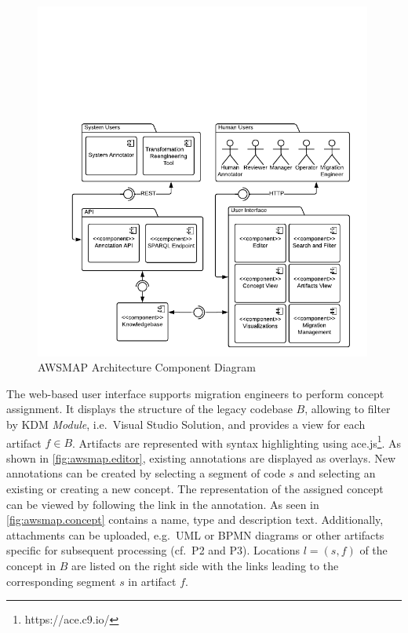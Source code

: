 \begin{figure}
\hypertarget{fig:awsmap}{%
\centering
\includegraphics[width=0.99\textwidth]{../figures/awsmap.pdf}
\caption{AWSMAP Architecture Component Diagram}\label{fig:awsmap}
}
\end{figure}

The web-based user interface supports migration engineers to perform concept assignment.
It displays the structure of the legacy codebase \(B\), allowing to filter by KDM \emph{Module}, i.e.~Visual Studio Solution, and provides a view for each artifact \(f \in B\).
Artifacts are represented with syntax highlighting using ace.js\footnote{https://ace.c9.io/}.
As shown in \cref{fig:awsmap.editor}, existing annotations are displayed as overlays.
New annotations can be created by selecting a segment of code \(s\) and selecting an existing or creating a new concept.
The representation of the assigned concept can be viewed by following the link in the annotation.
As seen in \cref{fig:awsmap.concept} contains a name, type and description text.
Additionally, attachments can be uploaded, e.g.~UML or BPMN diagrams or other artifacts specific for subsequent processing (cf.~P2 and P3).
Locations \(l=(s,f)\) of the concept in \(B\) are listed on the right side with the links leading to the corresponding segment \(s\) in artifact \(f\).

